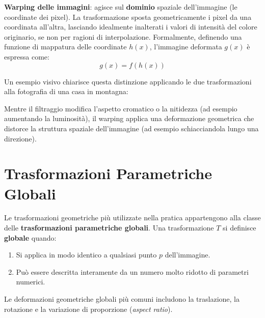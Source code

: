 ﻿\documentclass[11pt, a4paper]{article}
\begin{document}
\textbf{Warping delle immagini}: agisce sul \textbf{dominio} spaziale dell'immagine (le coordinate dei pixel). La trasformazione sposta geometricamente i pixel da una coordinata all'altra, lasciando idealmente inalterati i valori di intensità del colore originario, se non per ragioni di interpolazione. Formalmente, definendo una funzione di mappatura delle coordinate $h(x)$, l'immagine deformata $g(x)$ è espressa come:
\[
g(x) = f(h(x))
\]


Un esempio visivo chiarisce questa distinzione applicando le due trasformazioni alla fotografia di una casa in montagna:


Mentre il filtraggio modifica l'aspetto cromatico o la nitidezza (ad esempio aumentando la luminosità), il warping applica una deformazione geometrica che distorce la struttura spaziale dell'immagine (ad esempio schiacciandola lungo una direzione).

\newpage

\section{Trasformazioni Parametriche Globali}

Le trasformazioni geometriche più utilizzate nella pratica appartengono alla classe delle \textbf{trasformazioni parametriche globali}. Una trasformazione $T$ si definisce \textbf{globale} quando:
\begin{enumerate}[noitemsep]
    \item Si applica in modo identico a qualsiasi punto $p$ dell'immagine.
    \item Può essere descritta interamente da un numero molto ridotto di parametri numerici.
\end{enumerate}

Le deformazioni geometriche globali più comuni includono la traslazione, la rotazione e la variazione di proporzione (\emph{aspect ratio}).

\end{document}
